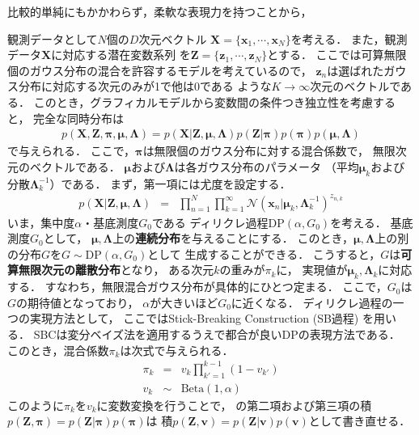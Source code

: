 比較的単純にもかかわらず，柔軟な表現力を持つことから，

観測データとして$N$個の$D$次元ベクトル
$\bm{X} = \{\bm x_{1},\cdots,\bm x_{N}\}$を考える．
また，観測データ$\bm X$に対応する潜在変数系列
を$\bm{Z} = \{\bm z_{1},\cdots,\bm z_{N}\}$とする．
ここでは可算無限個のガウス分布の混合を許容するモデルを考えているので，
$\bm z_{n}$は選ばれたガウス分布に対応する次元のみが1で他は0である
ような$K \rightarrow \infty$次元のベクトルである．
このとき，グラフィカルモデルから変数間の条件つき独立性を考慮すると，
完全な同時分布は
\begin{eqnarray}
p(\bm{X},\bm{Z},\bm\pi,\bm\mu,\bm\Lambda) 
 = 
 p(\bm{X}|\bm{Z},\bm\mu,\bm\Lambda)  
 p(\bm{Z}|\bm\pi) 
 p(\bm\pi)
 p(\bm\mu,\bm\Lambda) 
 \label{eq:jointp}
\end{eqnarray}
で与えられる．
ここで，$\bm\pi$は無限個のガウス分布に対する混合係数で，
無限次元のベクトルである．
$\bm\mu$および$\bm\Lambda$は各ガウス分布のパラメータ
（平均$\bm\mu_{k}$および分散$\bm\Lambda_{k}^{-1}$）である．
まず，第一項には尤度を設定する．
\begin{eqnarray}
 p(\bm{X}|\bm{Z},\bm\mu,\bm\Lambda) 
  &=& \prod_{n=1}^{N} \prod_{k=1}^{\infty} 
      \mathcal{N}\left(\bm{x}_{n}\big|\bm\mu_{k},\bm\Lambda_{k}^{-1}\right)^{z_{n,k}}
      \label{eq:pxzmula}
\end{eqnarray}
いま，集中度$\alpha$・基底測度$G_0$である
ディリクレ過程$\mbox{DP}(\alpha,G_0)$を考える．
基底測度$G_0$として，
$\bm{\mu},\bm{\Lambda}$上の{\bf 連続分布}を与えることにする．
このとき，$\bm{\mu},\bm{\Lambda}$上の別の分布$G$を$G \sim \mbox{DP}(\alpha,G_0)$として
生成することができる．
こうすると，$G$は{\bf 可算無限次元の離散分布}となり，
ある次元$k$の重みが$\pi_k$に，
実現値が$\bm\mu_k,\bm\Lambda_k$に対応する．
すなわち，無限混合ガウス分布が具体的にひとつ定まる．
ここで，$G_0$は$G$の期待値となっており，
$\alpha$が大きいほど$G_0$に近くなる．
ディリクレ過程の一つの実現方法として，
ここではStick-Breaking Construction (SB過程) を用いる．
SBCは変分ベイズ法を適用するうえで都合が良いDPの表現方法である．
このとき，混合係数$\pi_k$は次式で与えられる．
\begin{eqnarray}
 \pi_k &=& v_k \prod_{k'=1}^{k-1} (1 - v_{k'}) \\
 v_{k} &\sim& \mbox{Beta}(1, \alpha)
\end{eqnarray}
このように$\pi_k$を$v_k$に変数変換を行うことで，
の第二項および第三項の積$p(\bm{Z},\bm\pi)=p(\bm{Z}|\bm\pi)p(\bm\pi)$は
積$p(\bm{Z},\bm{v})=p(\bm{Z}|\bm{v})p(\bm{v})$として書き直せる．
